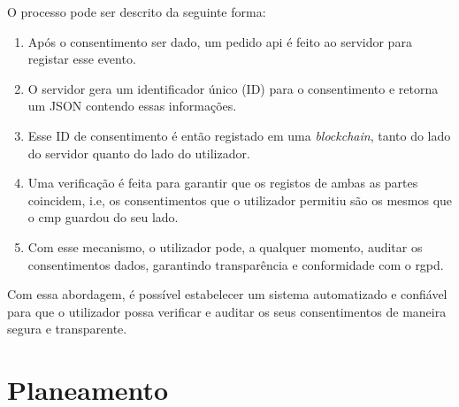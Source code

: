 O processo pode ser descrito da seguinte forma:

\begin{enumerate}
    \item Após o consentimento ser dado, um pedido \acrshort{api} é feito ao servidor para registar esse evento.
    \item O servidor gera um identificador único (ID) para o consentimento e retorna um JSON contendo essas informações.
    \item Esse ID de consentimento é então registado em uma \textit{blockchain}, tanto do lado do servidor quanto do lado do utilizador.
    \item Uma verificação é feita para garantir que os registos de ambas as partes coincidem, i.e, os consentimentos que o utilizador permitiu são os mesmos que o \acrshort{cmp} guardou do seu lado.
    \item Com esse mecanismo, o utilizador pode, a qualquer momento, auditar os consentimentos dados, garantindo transparência e conformidade com o \acrshort{rgpd}.
\end{enumerate}

Com essa abordagem, é possível estabelecer um sistema automatizado e confiável para que o utilizador possa verificar e auditar os seus consentimentos de maneira segura e transparente.


\section{Planeamento}

\begin{table}[H]
\centering
\renewcommand{\arraystretch}{1.3} %
\setlength{\tabcolsep}{4pt} %
\caption{Plano de atividades.}
\label{tab:plano-atividades}
\end{table}


